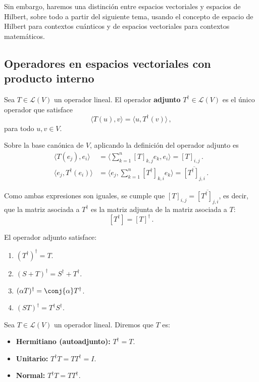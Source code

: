 Sin embargo, haremos una distinción entre espacios vectoriales y espacios de Hilbert, sobre todo a partir del siguiente tema, usando el concepto de espacio de Hilbert para contextos cuánticos y de espacios vectoriales para contextos matemáticos.

\subsection{Operadores en espacios vectoriales con producto interno}

\begin{defi}
  Sea $T\in\mathcal{L}(V)$ un operador lineal. El operador \textbf{adjunto} $T^\dagger\in\mathcal{L}(V)$ es el único operador que satisface
  \begin{equation*}
    \langle T(u), v \rangle = \langle u, T^\dagger (v) \rangle\,,
  \end{equation*}
  para todo $u,v \in V$.
\end{defi}

Sobre la base canónica de $V$, aplicando la definición del operador adjunto es
\begin{align*}
  \langle T(e_j), e_i \rangle         & = \langle \sum_{k=1}^n [T]_{k,j} e_k, e_i \rangle = [T]_{i,j}\,.                            \\
  \langle e_j, T^\dagger(e_i) \rangle & = \langle e_j, \sum_{k=1}^n [T^\dagger]_{k,i} e_k \rangle = \overline{[T^\dagger]_{j,i}}\,.
\end{align*}

Como ambas expresiones son iguales, se cumple que $[T]_{i,j} = \overline{[T^\dagger]_{j,i}}$, es decir, que la matriz asociada a $T^\dagger$ es la matriz adjunta de la matriz asociada a $T$:
\[
  [T^\dagger] = [T]^\dagger\,.
\]

\begin{prop}
  El operador adjunto satisface:
  \begin{enumerate}
    \item $(T^\dagger)^\dagger = T$.
    \item $(S + T)^\dagger = S^\dagger + T^\dagger$.
    \item $(\alpha T)^\dagger = \conj{\alpha} T^\dagger$.
    \item $(ST)^\dagger = T^\dagger S^\dagger$.
  \end{enumerate}
\end{prop}

\begin{defi}
  Sea $T\in\mathcal{L}(V)$ un operador lineal. Diremos que $T$ es:
  \begin{itemize}
    \item \textbf{Hermitiano (autoadjunto):} $T^\dagger = T$.
    \item \textbf{Unitario:} $T^\dagger T = TT^\dagger = I$.
    \item \textbf{Normal:} $T^\dagger T = TT^\dagger$.
  \end{itemize}
\end{defi}

